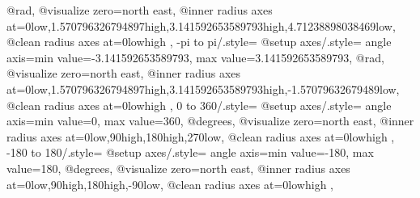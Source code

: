 {{{      @rad,
      @visualize zero=north east,
      @inner radius axes at={{0}{low},{1.570796326794897}{high},{3.141592653589793}{high},{4.71238898038469}{low}},
      @clean radius axes at={{0}{low}{high}{}{}}
    }
  },
  -pi to pi/.style={
    @setup axes/.style={
      angle axis={min value=-3.141592653589793, max value=3.141592653589793},
      @rad,
      @visualize zero=north east,
      @inner radius axes at={{0}{low},{1.570796326794897}{high},{3.141592653589793}{high},{-1.57079632679489}{low}},
      @clean radius axes at={{0}{low}{high}{}{}}
    }
  },
  0 to 360/.style={
    @setup axes/.style={
      angle axis={min value=0, max value=360},
      @degrees,
      @visualize zero=north east,
      @inner radius axes at={{0}{low},{90}{high},{180}{high},{270}{low}},
      @clean radius axes at={{0}{low}{high}{}{}}
    }
  },
  -180 to 180/.style={
    @setup axes/.style={
      angle axis={min value=-180, max value=180},
      @degrees,
      @visualize zero=north east,
      @inner radius axes at={{0}{low},{90}{high},{180}{high},{-90}{low}},
      @clean radius axes at={{0}{low}{high}{}{}}
    }
  },
}%





%




\endinput
